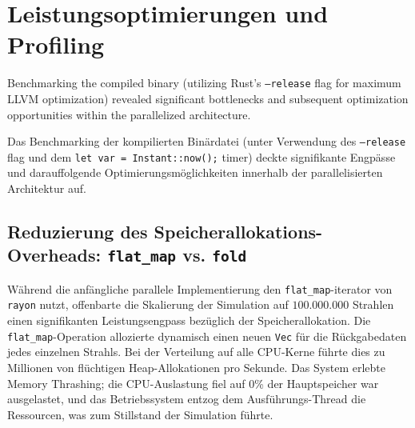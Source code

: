 \documentclass{article}
\begin{document}
    \section{Leistungsoptimierungen und Profiling}
        \label{sec:optimizations}
    Benchmarking the compiled binary (utilizing Rust's \texttt{--release} flag for maximum LLVM optimization)
    revealed significant bottlenecks and subsequent optimization opportunities within the parallelized architecture.

    Das Benchmarking der kompilierten Binärdatei (unter Verwendung des \texttt{--release} flag und dem \texttt{let var = Instant::now();} timer) deckte signifikante
    Engpässe und darauffolgende Optimierungsmöglichkeiten innerhalb der parallelisierten Architektur auf.

    \subsection{Reduzierung des Speicherallokations-Overheads: \texttt{flat\_map} vs. \texttt{fold}}
    \label{sec:memory_overhead}


    Während die anfängliche parallele Implementierung den \texttt{flat\_map}-iterator von \texttt{rayon} nutzt, offenbarte die Skalierung der Simulation auf $100.000.000$ Strahlen einen
    signifikanten Leistungsengpass bezüglich der Speicherallokation.
    Die \texttt{flat\_map}-Operation allozierte dynamisch einen neuen \texttt{Vec} für die Rückgabedaten jedes einzelnen Strahls.
    Bei der Verteilung auf alle CPU-Kerne führte dies zu Millionen von flüchtigen Heap-Allokationen pro Sekunde.
    Das System erlebte Memory Thrashing; die CPU-Auslastung fiel auf 0\% der Hauptspeicher war ausgelastet, und das Betriebssystem entzog dem Ausführungs-Thread die Ressourcen,
    was zum Stillstand der Simulation führte.
\end{document}

